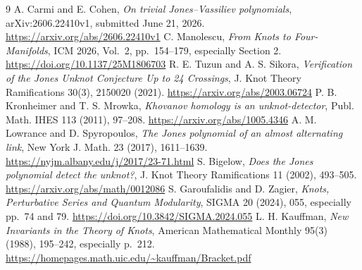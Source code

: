 \documentclass[11pt]{article}
\begin{document}
\begin{thebibliography}{9}\small
{} A. Carmi and E. Cohen, \emph{On trivial Jones--Vassiliev polynomials}, arXiv:2606.22410v1, submitted June 21, 2026. \url{https://arxiv.org/abs/2606.22410v1}
 C. Manolescu, \emph{From Knots to Four-Manifolds}, ICM 2026, Vol.~2, pp.~154--179, especially Section 2. \url{https://doi.org/10.1137/25M1806703}
 R. E. Tuzun and A. S. Sikora, \emph{Verification of the Jones Unknot Conjecture Up to 24 Crossings}, J. Knot Theory Ramifications 30(3), 2150020 (2021). \url{https://arxiv.org/abs/2003.06724}
 P. B. Kronheimer and T. S. Mrowka, \emph{Khovanov homology is an unknot-detector}, Publ. Math. IHES 113 (2011), 97--208. \url{https://arxiv.org/abs/1005.4346}
 A. M. Lowrance and D. Spyropoulos, \emph{The Jones polynomial of an almost alternating link}, New York J. Math. 23 (2017), 1611--1639. \url{https://nyjm.albany.edu/j/2017/23-71.html}
 S. Bigelow, \emph{Does the Jones polynomial detect the unknot?}, J. Knot Theory Ramifications 11 (2002), 493--505. \url{https://arxiv.org/abs/math/0012086}
 S. Garoufalidis and D. Zagier, \emph{Knots, Perturbative Series and Quantum Modularity}, SIGMA 20 (2024), 055, especially pp.~74 and 79. \url{https://doi.org/10.3842/SIGMA.2024.055}
 L. H. Kauffman, \emph{New Invariants in the Theory of Knots}, American Mathematical Monthly 95(3) (1988), 195--242, especially p.~212. \url{https://homepages.math.uic.edu/~kauffman/Bracket.pdf}
\end{thebibliography}
\end{document}
